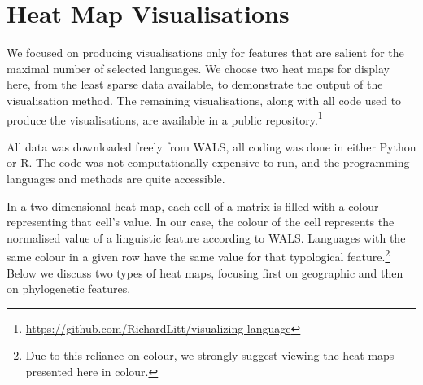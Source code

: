 \documentclass[11pt]{article}
\begin{document}
\section{Heat Map Visualisations}

We focused on producing visualisations only for features that are salient for the maximal number of selected languages. We choose two heat maps for display here, from the least sparse data available, to demonstrate the output of the visualisation method. The remaining visualisations, along with all code used to produce the visualisations, are available in a public repository.\footnote{\url{https://github.com/RichardLitt/visualizing-language}}

All data was downloaded freely from WALS, all coding was done in either Python or R. The code was not computationally expensive to run, and the programming languages and methods are quite accessible. 

In a two-dimensional heat map, each cell of a matrix is filled with a colour representing that cell's value. In our case, the colour of the cell represents the normalised value of a linguistic feature according to WALS. Languages with the same colour in a given row have the same value for that typological feature.\footnote{Due to this reliance on colour, we strongly suggest viewing the heat maps presented here in colour.} Below we discuss two types of heat maps, focusing first on geographic and then on phylogenetic features.
\end{document}
